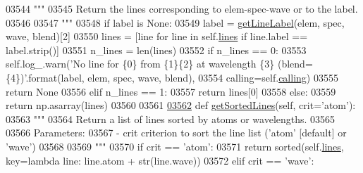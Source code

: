 \begin{DoxyCode}
{{{{{{{{{{{{{{{{{{{{{{03544         \textcolor{stringliteral}{"""}
03545 \textcolor{stringliteral}{        Return the lines corresponding to elem-spec-wave or to the label.}
03546 \textcolor{stringliteral}{        }
03547 \textcolor{stringliteral}{        """}
03548         \textcolor{keywordflow}{if} label \textcolor{keywordflow}{is} \textcolor{keywordtype}{None}:
03549             label = \hyperlink{namespacepyneb_1_1core_1_1pynebcore_a14c882fc308d727f77ed33c1f56212e4}{getLineLabel}(elem, spec, wave, blend)[2]
03550         lines = [line \textcolor{keywordflow}{for} line \textcolor{keywordflow}{in} self.\hyperlink{classpyneb_1_1core_1_1pynebcore_1_1_observation_a78332043ca9f290590edf6b8a1e5b767}{lines} \textcolor{keywordflow}{if} line.label == label.strip()]
03551         n\_lines = len(lines)
03552         \textcolor{keywordflow}{if} n\_lines == 0:
03553             self.log\_.warn(\textcolor{stringliteral}{'No line for \{0\} from \{1\}\{2\} at wavelength \{3\} (blend=\{4\})'}.format(label, elem, 
      spec, wave, blend),
03554                            calling=self.\hyperlink{classpyneb_1_1core_1_1pynebcore_1_1_observation_a2639fad9af4fefad20e4097295bd40e7}{calling})
03555             \textcolor{keywordflow}{return} \textcolor{keywordtype}{None}
03556         \textcolor{keywordflow}{elif} n\_lines == 1:
03557             \textcolor{keywordflow}{return} lines[0]
03558         \textcolor{keywordflow}{else}:
03559             \textcolor{keywordflow}{return} np.asarray(lines)
03560  
03561 
\hypertarget{pynebcore_8py_source_l03562}{}\hyperlink{classpyneb_1_1core_1_1pynebcore_1_1_observation_a2b18c06854c5492b53b7e91311bf1cff}{03562}     \textcolor{keyword}{def }\hyperlink{classpyneb_1_1core_1_1pynebcore_1_1_observation_a2b18c06854c5492b53b7e91311bf1cff}{getSortedLines}(self, crit='atom'):
03563         \textcolor{stringliteral}{"""}
03564 \textcolor{stringliteral}{        Return a list of lines sorted by atoms or wavelengths.}
03565 \textcolor{stringliteral}{        }
03566 \textcolor{stringliteral}{        Parameters:}
03567 \textcolor{stringliteral}{            - crit   criterion to sort the line list ('atom' [default] or 'wave')}
03568 \textcolor{stringliteral}{}
03569 \textcolor{stringliteral}{        """}
03570         \textcolor{keywordflow}{if} crit == \textcolor{stringliteral}{'atom'}:
03571             \textcolor{keywordflow}{return} sorted(self.\hyperlink{classpyneb_1_1core_1_1pynebcore_1_1_observation_a78332043ca9f290590edf6b8a1e5b767}{lines}, key=\textcolor{keyword}{lambda} line: line.atom + str(line.wave))
03572         \textcolor{keywordflow}{elif} crit == \textcolor{stringliteral}{'wave'}:
}}}}}}}}}}}}}}}}}}}}}}
\end{DoxyCode}
